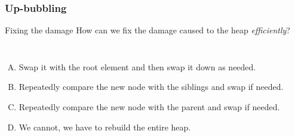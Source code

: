 \begin{frame}
	\frametitle{Up-bubbling}

	\begin{problemblock}{Fixing the damage}
		How can we fix the damage caused to the heap \textit{efficiently}?
		\begin{columns}
			\pause
			\begin{enumerate}[A.]
				\item Swap it with the root element and then swap it down as needed.
				\item Repeatedly compare the new node with the siblings and swap if needed.
				\item Repeatedly compare the new node with the parent and swap if needed.
				\item We cannot, we have to rebuild the entire heap.
			\end{enumerate}
		\end{columns}
	\end{problemblock}
\end{frame}

